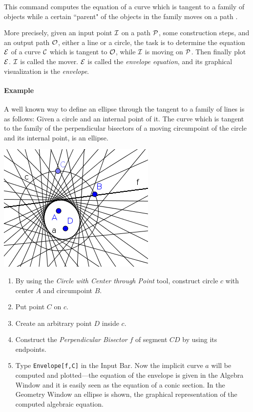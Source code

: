 \documentclass{article}
\begin{document}
This command computes the equation of a curve which is tangent to a family of objects while a certain ``parent" of the objects in the family moves on a path \cite{BotanaRecio2017}.

More precisely, given an input point $\cal{I}$ on a path $\cal{P}$, some construction steps, and an output path $\cal O$, either a line or a circle, the task is to determine the equation $\cal E$ of a curve $\cal C$ which is tangent to $\cal O$, while $\cal I$ is moving on $\cal P$. Then finally plot $\cal E$. $\cal I$ is called the mover. $\cal E$ is called the \textit{envelope equation}, and its graphical visualization is the \textit{envelope}.


\paragraph{Example} A well known way to define an ellipse through the tangent to a family of lines is as follows:
Given a circle and an internal point of it.
The curve which is tangent to the family of the perpendicular bisectors of a moving circumpoint
of the circle and its internal point, is an ellipse.

\begin{center}
\includegraphics[scale=0.5]{Envelope-example}
\end{center}
\begin{enumerate}
    \item By using the \textit{Circle with Center through Point} tool, construct circle $c$ with center $A$ and circumpoint $B$.
    \item Put point $C$ on $c$.
    \item Create an arbitrary point $D$ inside $c$.
    \item Construct the \textit{Perpendicular Bisector} $f$ of segment $CD$ by using its endpoints.
    \item Type \texttt{Envelope[f,C]} in the Input Bar. Now the implicit curve $a$ will be computed and plotted---the equation of the envelope is given in the Algebra Window and it is easily seen as
the equation of a conic section. In the Geometry Window an ellipse is shown, the graphical
representation of the computed algebraic equation.
\end{enumerate}
\end{document}
